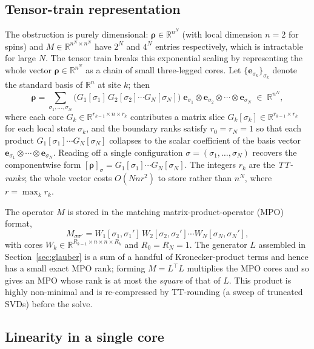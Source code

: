 \documentclass[12pt]{article}
\newcommand{\R}{\mathbb{R}}
\newcommand{\brho}{\boldsymbol{\rho}}
\theoremstyle{definition}
\theoremstyle{remark}
\begin{document}
\subsection{Tensor-train representation}\label{sec:tt-rep}

The obstruction is purely dimensional: $\brho \in \R^{n^N}$ (with local dimension $n = 2$ for spins) and $M \in \R^{n^N \times n^N}$ have $2^N$ and $4^N$ entries respectively, which is intractable for large $N$. The tensor train breaks this exponential scaling by representing the whole vector $\brho \in \R^{n^N}$ as a chain of small three-legged cores. Let $\{\mathbf{e}_{\sigma_k}\}_{\sigma_k}$ denote the standard basis of $\R^n$ at site $k$; then
\[
\brho = \sum_{\sigma_1, \dots, \sigma_N}
  \big(G_1[\sigma_1]\, G_2[\sigma_2] \cdots G_N[\sigma_N]\big)\;
  \mathbf{e}_{\sigma_1} \otimes \mathbf{e}_{\sigma_2} \otimes \cdots \otimes \mathbf{e}_{\sigma_N}
  \;\in\; \R^{n^N},
\]
where each core $G_k \in \R^{r_{k-1} \times n \times r_k}$ contributes a matrix slice $G_k[\sigma_k] \in \R^{r_{k-1} \times r_k}$ for each local state $\sigma_k$, and the boundary ranks satisfy $r_0 = r_N = 1$ so that each product $G_1[\sigma_1] \cdots G_N[\sigma_N]$ collapses to the scalar coefficient of the basis vector $\mathbf{e}_{\sigma_1} \otimes \cdots \otimes \mathbf{e}_{\sigma_N}$. Reading off a single configuration $\sigma = (\sigma_1, \dots, \sigma_N)$ recovers the componentwise form $[\brho]_\sigma = G_1[\sigma_1] \cdots G_N[\sigma_N]$. The integers $r_k$ are the \emph{TT-ranks}; the whole vector costs $O(Nnr^2)$ to store rather than $n^N$, where $r = \max_k r_k$.

The operator $M$ is stored in the matching matrix-product-operator (MPO) format,
\[
M_{\sigma\sigma'} = W_1[\sigma_1, \sigma_1']\, W_2[\sigma_2, \sigma_2'] \cdots W_N[\sigma_N, \sigma_N'],
\]
with cores $W_k \in \R^{R_{k-1} \times n \times n \times R_k}$ and $R_0 = R_N = 1$. The generator $L$ assembled in Section~\ref{sec:glauber} is a sum of a handful of Kronecker-product terms and hence has a small exact MPO rank; forming $M = L^\top L$ multiplies the MPO cores and so gives an MPO whose rank is at most the \emph{square} of that of $L$. This product is highly non-minimal and is re-compressed by TT-rounding (a sweep of truncated SVDs) before the solve.

\subsection{Linearity in a single core}\label{sec:core-linearity}
\end{document}
